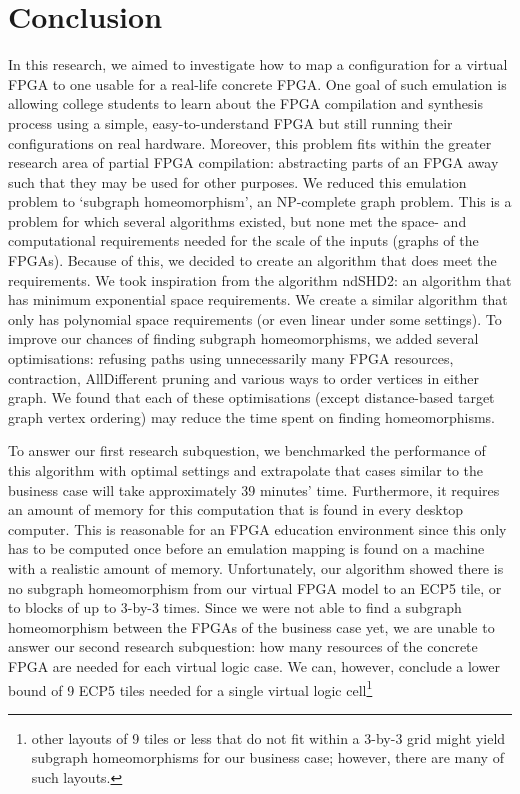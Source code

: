 \chapter{Conclusion}
\label{chapter:conclusion}
In this research, we aimed to investigate how to map a configuration for a virtual FPGA to one usable for a real-life concrete FPGA. One goal of such emulation is allowing college students to learn about the FPGA compilation and synthesis process using a simple, easy-to-understand FPGA but still running their configurations on real hardware. Moreover, this problem fits within the greater research area of partial FPGA compilation: abstracting parts of an FPGA away such that they may be used for other purposes.  We reduced this emulation problem to `subgraph homeomorphism', an NP-complete graph problem. This is a problem for which several algorithms existed, but none met the space- and computational requirements needed for the scale of the inputs (graphs of the FPGAs). Because of this, we decided to create an algorithm that does meet the requirements. We took inspiration from the algorithm ndSHD2: an algorithm that has minimum exponential space requirements. We create a similar algorithm that only has polynomial space requirements (or even linear under some settings). To improve our chances of finding subgraph homeomorphisms, we added several optimisations: refusing paths using unnecessarily many FPGA resources, contraction, AllDifferent pruning and various ways to order vertices in either graph. We found that each of these optimisations (except distance-based target graph vertex ordering) may reduce the time spent on finding homeomorphisms.

To answer our first research subquestion, we benchmarked the performance of this algorithm with optimal settings and extrapolate that cases similar to the business case will take approximately 39 minutes' time. Furthermore, it requires an amount of memory for this computation that is found in every desktop computer. This is reasonable for an FPGA education environment since this only has to be computed once before an emulation mapping is found on a machine with a realistic amount of memory. Unfortunately, our algorithm showed there is no subgraph homeomorphism from our virtual FPGA model to an ECP5 tile, or to blocks of up to 3-by-3 times. Since we were not able to find a subgraph homeomorphism between the FPGAs of the business case yet, we are unable to answer our second research subquestion: how many resources of the concrete FPGA are needed for each virtual logic case. We can, however, conclude a lower bound of 9 ECP5 tiles needed for a single virtual logic cell\footnote{other layouts of 9 tiles or less that do not fit within a 3-by-3 grid might yield subgraph homeomorphisms for our business case; however, there are many of such layouts.}

